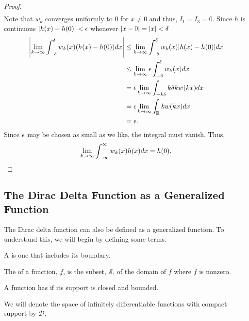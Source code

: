\begin{proof}
\begin{equation}
\begin{split}
        \end{split}
    \end{equation}
    Note that \(w_k\) converges uniformly to 0 for \(x\neq 0\) and thus, \(I_1=I_3 =0\). Since \(h\) is continuous \(|h(x)-h(0)|<\epsilon\) whenever \(|x-0|=|x|<\delta\)
    \begin{equation*}
        \begin{split}
            \left| \lim_{k\to \infty} \int_{-\delta}^{\delta} w_k(x)(h(x)-h(0))dx \right| & \leq  \lim_{k\to \infty} \int_{-\delta}^{\delta} w_k(x)|h(x)-h(0)|dx \\
            & \leq \lim_{k\to \infty} \epsilon\int_{-\delta}^{\delta}w_k(x)dx\\
            &= \epsilon \lim_{k\to \infty} \int_{-k\delta}{k\delta} kw(kx)dx\\
            &= \epsilon \lim_{k\to \infty} \int_\mathbb{R} kw(kx)dx\\
            &= \epsilon.
        \end{split}
    \end{equation*}
    Since \(\epsilon\) may be chosen as small as we like, the integral must vanish. Thus,
    \begin{equation}
        \lim_{k\rightarrow \infty}\int_{-\infty}^{\infty} w_k(x)h(x) dx = h(0).
    \end{equation}


\end{proof}



\subsection{The Dirac Delta Function as a Generalized Function}
The Dirac delta function can also be defined as a generalized function. To understand this, we will begin by defining some terms.

\begin{definition}
     A  is one that includes its boundary.
\end{definition}

\begin{definition}
    The  of a function, \(f\), is the subset, \(\mathcal{S}\), of the domain of \(f\) where \(f\) is nonzero.
\end{definition}

\begin{definition}
    A function has  if its support is closed and bounded.
\end{definition}
We will denote the space of infinitely differentiable functions with compact support by \(\mathcal{D}\).

